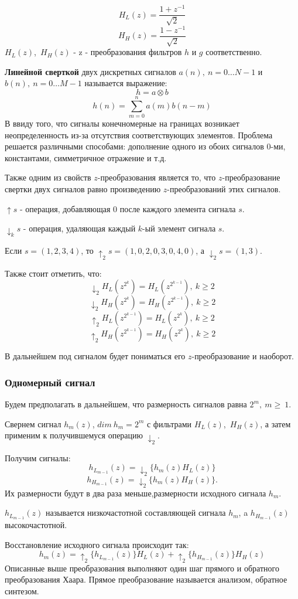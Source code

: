 \documentclass{article}
\begin{document}
$$ H_{L}(z) = \frac{1 + z^{-1}}{\sqrt{2}} $$
$$ H_{H}(z) = \frac{1 - z^{-1}}{\sqrt{2}} $$
$H_{L}(z)$,~$H_{H}(z)$ - z - преобразования фильтров $h$ и $g$ соответственно.

\textbf{Линейной сверткой} двух дискретных сигналов $a(n),~ n=0 \ldots N-1$ и $b(n),~ n=0 \ldots M-1$ называется выражение:
$$ h = a \otimes b $$
$$ h(n) =  \sum_{m=0}^{n} a(m)b(n-m) $$
В ввиду того, что сигналы конечномерные на границах возникает неопределенность из-за отсутствия соответствующих элементов. Проблема решается различными способами: дополнение одного из обоих сигналов $0$-ми, константами, симметричное отражение и т.д.

Также одним из свойств $z$-преобразования является то, что $z$-преобразование свертки двух сигналов равно произведению $z$-преобразований этих сигналов. 

\textbf{$\uparrow s$} - операция, добавляющая $0$ после каждого элемента сигнала $s$.

\textbf{$\downarrow_k s$} - операция, удаляющая каждый $k$-ый элемент сигнала $s$.

Если $s = (1,2,3,4)$, то $\uparrow_2 s = (1,0,2,0,3,0,4,0)$, а $\downarrow_{2} s = (1,3)$.

Также стоит отметить, что:
$$\downarrow_2 H_L(z^{2^k}) = H_L(z^{2^{k-1}}),~ k\geq 2$$
$$\downarrow_2 H_H(z^{2^k}) = H_H(z^{2^{k-1}}),~ k\geq 2$$
$$\uparrow_2 H_L(z^{2^{k-1}}) = H_L(z^{2^{k}}),~ k\geq 2$$
$$\uparrow_2 H_H(z^{2^{k-1}}) = H_H(z^{2^{k}}),~ k\geq 2$$

В дальнейшем под сигналом будет пониматься его $z$-преобразование и наоборот.
\subsubsection{Одномерный сигнал}
Будем предполагать в дальнейшем, что размерность сигналов равна $2^m,~m \geq~1$.

Свернем сигнал $h_m(z)$, $dim~h_m = 2^m$ с фильтрами $H_L(z)$,~$H_H(z)$, а затем применим к получившемуся операцию $\downarrow_2$.

Получим сигналы: $$h_{L_{m-1}}(z) = \downarrow_2 \{h_m(z)H_L(z)\}$$ $$h_{H_{m-1}}(z) = \downarrow_2 \{h_m(z)H_H(z)\}.$$ Их размерности будут в два раза меньше,размерности исходного сигнала $h_m$.

$h_{L_{m-1}}(z)$ называется низкочастотной составляющей сигнала $h_m$, a $h_{H_{m-1}}(z)$ высокочастотной. 

Восстановление исходного сигнала происходит так:
$$h_m(z) = \uparrow_2 \{ h_{L_{m-1}}(z) \} H_L(z) + \uparrow_2 \{ h_{H_{m-1}}(z) \} H_H(z)	$$
Описанные выше преобразования выполняют один шаг прямого и обратного преобразования Хаара. Прямое преобразование называется анализом, обратное синтезом.
\end{document}
